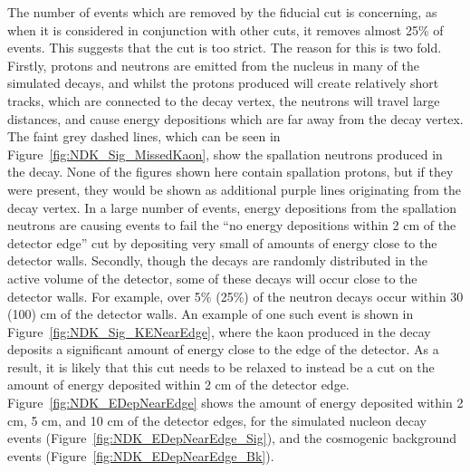 The number of events which are removed by the fiducial cut is concerning, as when it is considered in conjunction with other cuts, it removes almost 25\% of events. This suggests that the cut is too strict. The reason for this is two fold. Firstly, protons and neutrons are emitted from the nucleus in many of the simulated decays, and whilst the protons produced will create relatively short tracks, which are connected to the decay vertex, the neutrons will travel large distances, and cause energy depositions which are far away from the decay vertex. The faint grey dashed lines, which can be seen in Figure~\ref{fig:NDK_Sig_MissedKaon}, show the spallation neutrons produced in the decay. None of the figures shown here contain spallation protons, but if they were present, they would be shown as additional purple lines originating from the decay vertex. In a large number of events, energy depositions from the spallation neutrons are causing events to fail the ``no energy depositions within 2 cm of the detector edge'' cut by depositing very small of amounts of energy close to the detector walls. Secondly, though the decays are randomly distributed in the active volume of the detector, some of these decays will occur close to the detector walls. For example, over 5\% (25\%) of the neutron decays occur within 30 (100) cm of the detector walls. An example of one such event is shown in Figure~\ref{fig:NDK_Sig_KENearEdge}, where the kaon produced in the decay deposits a significant amount of energy close to the edge of the detector. As a result, it is likely that this cut needs to be relaxed to instead be a cut on the amount of energy deposited within 2 cm of the detector edge. Figure~\ref{fig:NDK_EDepNearEdge} shows the amount of energy deposited within 2 cm, 5 cm, and 10 cm of the detector edges, for the simulated nucleon decay events (Figure~\ref{fig:NDK_EDepNearEdge_Sig}), and the cosmogenic background events (Figure~\ref{fig:NDK_EDepNearEdge_Bk}). \\ 

